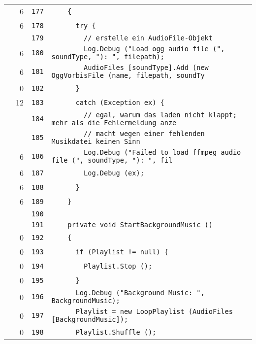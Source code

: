 \documentclass[a4paper,10pt]{article}
\begin{document}
\begin{longtable}[l]{lrrl}
\cellcolor{green} & 6 & \verb~177~ & \verb~    {~\\
\cellcolor{green} & 6 & \verb~178~ & \verb~      try {~\\
\cellcolor{gray} &  & \verb~179~ & \verb~        // erstelle ein AudioFile-Objekt~\\
\cellcolor{green} & 6 & \verb~180~ & \verb~        Log.Debug ("Load ogg audio file (", soundType, "): ", filepath);~\\
\cellcolor{green} & 6 & \verb~181~ & \verb~        AudioFiles [soundType].Add (new OggVorbisFile (name, filepath, soundTy~\\
\cellcolor{red} & 0 & \verb~182~ & \verb~      }~\\
\cellcolor{green} & 12 & \verb~183~ & \verb~      catch (Exception ex) {~\\
\cellcolor{gray} &  & \verb~184~ & \verb~        // egal, warum das laden nicht klappt; mehr als die Fehlermeldung anze~\\
\cellcolor{gray} &  & \verb~185~ & \verb~        // macht wegen einer fehlenden Musikdatei keinen Sinn~\\
\cellcolor{green} & 6 & \verb~186~ & \verb~        Log.Debug ("Failed to load ffmpeg audio file (", soundType, "): ", fil~\\
\cellcolor{green} & 6 & \verb~187~ & \verb~        Log.Debug (ex);~\\
\cellcolor{green} & 6 & \verb~188~ & \verb~      }~\\
\cellcolor{green} & 6 & \verb~189~ & \verb~    }~\\
\cellcolor{gray} &  & \verb~190~ & \verb~~\\
\cellcolor{gray} &  & \verb~191~ & \verb~    private void StartBackgroundMusic ()~\\
\cellcolor{red} & 0 & \verb~192~ & \verb~    {~\\
\cellcolor{red} & 0 & \verb~193~ & \verb~      if (Playlist != null) {~\\
\cellcolor{red} & 0 & \verb~194~ & \verb~        Playlist.Stop ();~\\
\cellcolor{red} & 0 & \verb~195~ & \verb~      }~\\
\cellcolor{red} & 0 & \verb~196~ & \verb~      Log.Debug ("Background Music: ", BackgroundMusic);~\\
\cellcolor{red} & 0 & \verb~197~ & \verb~      Playlist = new LoopPlaylist (AudioFiles [BackgroundMusic]);~\\
\cellcolor{red} & 0 & \verb~198~ & \verb~      Playlist.Shuffle ();~\\

\end{longtable}
\end{document}
